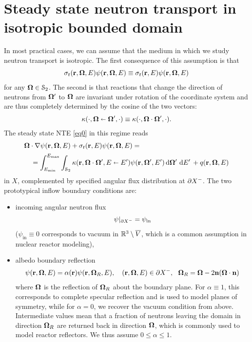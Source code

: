 \section{Steady state neutron transport in isotropic bounded domain}\label{sec:NTE}
In most practical cases, we can assume that the medium in which we study neutron transport is isotropic.
The first consequence of this assumption is that 
$$
	\sigma_t(\br,\bomega,E)\psi(\br,\bomega,E) \equiv \sigma_t(\br,E)\psi(\br,\bomega,E)
$$ 
for any $\bomega\in\Sphere$. The
second is that reactions that change the direction of neutrons from $\bomega'$ to $\bomega$ are
invariant under rotation of the coordinate system and are thus completely determined by the cosine of the two vectors:
$$
	\kappa(\cdot,\bomega\sla\bomega',\cdot) \equiv \kappa(\cdot,\bomega\cdot\bomega',\cdot).
$$
The steady state NTE \eqref{eq0} in this regime reads
\begin{equation}\label{eq1}
\begin{multlined}
  \bomega\cdot\nabla\psi(\br,\bomega,E) + \sigma_t(\br,E)\psi(\br,\bomega,E) =\\[.25em]
   = \intE[']{\Emin}{\Emax}{
      \intA[']{\kappa(\br,\bomega\cdot\bomega',E\sla E')\psi(\br,\bomega',E')}
    } + q(\br,\bomega,E)
 \end{multlined}
\end{equation}
in $X$, complemented by specified angular flux distribution at $\pX[-]$. The two prototypical inflow boundary
conditions are:
\begin{itemize}
	\item incoming angular neutron flux
	\begin{equation}\label{eq:nte2}
	  \psi\vert_{\pX[-]} = \psi_{\text{in}}
	\end{equation}
	($\psi_{\text{in}}\equiv 0$ corresponds to vacuum in $\R[3]\setminus \overline V$, which is a common
	 assumption in nuclear reactor modeling),
	
	\item albedo boundary reflection
	\begin{equation}\label{eq:nte3}
  	\psi(\br,\bomega,E) = \alpha(\br)\psi(\br, \bomega_R, E),\quad (\br,\bomega,E)\in \pX[-],\ \ \bomega_R = \bomega - 2
  	\bn (\bomega \cdot \bn)
  \end{equation}
  where $\bomega$ is the reflection of $\bomega_R$ about the boundary plane. For $\alpha \equiv 1$, this corresponds to
  complete specular reflection and is used to model planes of symmetry, while for $\alpha =
  0$, we recover the vacuum condition from above. Intermediate values mean that a fraction of neutrons leaving the
  domain in direction $\bomega_R$ are returned back in direction $\bomega$, which is commonly used to model reactor
  reflectors. We thus assume $0 \leq \alpha \leq 1$. 
\end{itemize}
